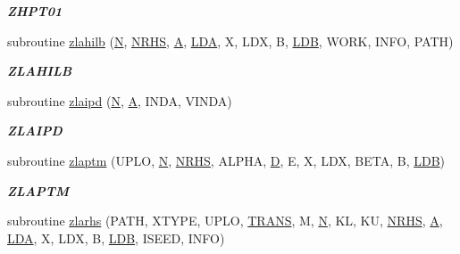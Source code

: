 \begin{DoxyCompactItemize}
\begin{DoxyCompactList}\small\item\em {\bfseries Z\+H\+P\+T01} \end{DoxyCompactList}\item 
subroutine \hyperlink{group__complex16__lin_gadea79d993de3d5b50ad2beb5b67811f4}{zlahilb} (\hyperlink{polmisc_8c_a0240ac851181b84ac374872dc5434ee4}{N}, \hyperlink{example__user_8c_aa0138da002ce2a90360df2f521eb3198}{N\+R\+H\+S}, \hyperlink{classA}{A}, \hyperlink{example__user_8c_ae946da542ce0db94dced19b2ecefd1aa}{L\+D\+A}, X, L\+D\+X, B, \hyperlink{example__user_8c_a50e90a7104df172b5a89a06c47fcca04}{L\+D\+B}, W\+O\+R\+K, I\+N\+F\+O, P\+A\+T\+H)
\begin{DoxyCompactList}\small\item\em {\bfseries Z\+L\+A\+H\+I\+L\+B} \end{DoxyCompactList}\item 
subroutine \hyperlink{group__complex16__lin_ga79ad3457281a864241d40aa4e1ee2d04}{zlaipd} (\hyperlink{polmisc_8c_a0240ac851181b84ac374872dc5434ee4}{N}, \hyperlink{classA}{A}, I\+N\+D\+A, V\+I\+N\+D\+A)
\begin{DoxyCompactList}\small\item\em {\bfseries Z\+L\+A\+I\+P\+D} \end{DoxyCompactList}\item 
subroutine \hyperlink{group__complex16__lin_gad53f05c03f73f161fa4b238c0083e120}{zlaptm} (U\+P\+L\+O, \hyperlink{polmisc_8c_a0240ac851181b84ac374872dc5434ee4}{N}, \hyperlink{example__user_8c_aa0138da002ce2a90360df2f521eb3198}{N\+R\+H\+S}, A\+L\+P\+H\+A, \hyperlink{odrpack_8h_a7dae6ea403d00f3687f24a874e67d139}{D}, E, X, L\+D\+X, B\+E\+T\+A, B, \hyperlink{example__user_8c_a50e90a7104df172b5a89a06c47fcca04}{L\+D\+B})
\begin{DoxyCompactList}\small\item\em {\bfseries Z\+L\+A\+P\+T\+M} \end{DoxyCompactList}\item 
subroutine \hyperlink{group__complex16__lin_gadf62e94d7d1eba45c66a510ca52f9802}{zlarhs} (P\+A\+T\+H, X\+T\+Y\+P\+E, U\+P\+L\+O, \hyperlink{superlu__enum__consts_8h_a0c4e17b2d5cea33f9991ccc6a6678d62a1f61e3015bfe0f0c2c3fda4c5a0cdf58}{T\+R\+A\+N\+S}, M, \hyperlink{polmisc_8c_a0240ac851181b84ac374872dc5434ee4}{N}, K\+L, K\+U, \hyperlink{example__user_8c_aa0138da002ce2a90360df2f521eb3198}{N\+R\+H\+S}, \hyperlink{classA}{A}, \hyperlink{example__user_8c_ae946da542ce0db94dced19b2ecefd1aa}{L\+D\+A}, X, L\+D\+X, B, \hyperlink{example__user_8c_a50e90a7104df172b5a89a06c47fcca04}{L\+D\+B}, I\+S\+E\+E\+D, I\+N\+F\+O)

\end{DoxyCompactItemize}
